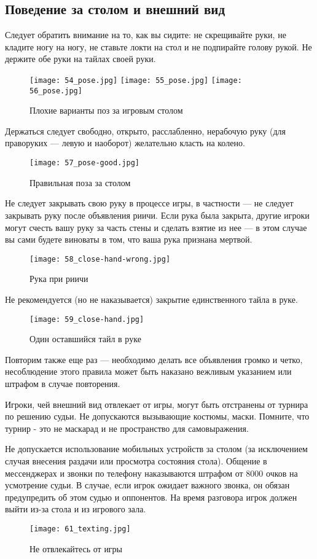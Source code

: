 \subsection{Поведение за столом и внешний вид}

Следует обратить внимание на то, как вы сидите: не скрещивайте руки, не кладите ногу на ногу, не ставьте локти на стол и не подпирайте голову рукой. Не держите обе руки на тайлах своей руки.

\begin{figure}[H]
	\centering
	\texttt{[image: 54\_pose.jpg]}
	\texttt{[image: 55\_pose.jpg]}
	\texttt{[image: 56\_pose.jpg]}
	\caption{Плохие варианты поз за игровым столом}
\end{figure}

\newpage

Держаться следует свободно, открыто, расслабленно, нерабочую руку (для праворуких — левую и наоборот) желательно класть на колено.

\begin{figure}[H]
	\centering
	\texttt{[image: 57\_pose-good.jpg]}
	\caption{Правильная поза за столом}
\end{figure}

Не следует закрывать свою руку в процессе игры, в частности --- не следует закрывать руку после объявления риичи. Если рука была закрыта, другие игроки могут счесть вашу руку за часть стены и сделать взятие из нее --- в этом случае вы сами будете виноваты в том, что ваша рука признана мертвой.

\begin{figure}[H]
	\centering
	\texttt{[image: 58\_close-hand-wrong.jpg]}
	\caption{Рука при риичи}
\end{figure}

\newpage

Не рекомендуется (но не наказывается) закрытие единственного тайла в руке.

\begin{figure}[H]
	\centering
	\texttt{[image: 59\_close-hand.jpg]}
	\caption{Один оставшийся тайл в руке}
\end{figure}

Повторим также еще раз --- необходимо делать все объявления громко и четко, несоблюдение этого правила может быть наказано вежливым указанием или штрафом в случае повторения.

Игроки, чей внешний вид отвлекает от игры, могут быть отстранены от турнира по решению судьи. Не допускаются вызывающие костюмы, маски. Помните, что турнир - это не маскарад и не пространство для самовыражения.

Не допускается использование мобильных устройств за столом (за исключением случая внесения раздачи или просмотра состояния стола). Общение в мессенджерах и звонки по телефону наказываются штрафом от 8000 очков на усмотрение судьи. В случае, если игрок ожидает важного звонка, он обязан предупредить об этом судью и оппонентов. На время разговора игрок должен выйти из-за стола и из игрового зала.

\begin{figure}[H]
	\centering
	\texttt{[image: 61\_texting.jpg]}
	\caption{Не отвлекайтесь от игры}
\end{figure}
